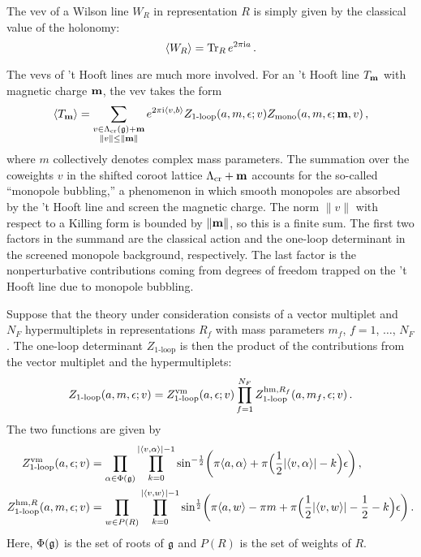 The vev of a Wilson line $W_R$ in representation $R$ is simply given
by the classical value of the holonomy:
\begin{equation}
  \label{eq:vev-W}
    \langle W_R \rangle = \mathop{\mathrm{Tr}}\nolimits_R e^{2\pi \mathrm{i} a} \,.
\end{equation}

The vevs of 't Hooft lines are much more involved.  For an 't Hooft
line $T_{\mathbf{m}}$ with magnetic charge $\mathbf{m}$, the vev takes the form
\begin{equation}
  \label{eq:vev-T}
  \langle T_{\mathbf{m}} \rangle
  =
  \sum_{\substack{v \in \Lambda_{\mathrm{cr}}(\mathfrak{g}) + \mathbf{m} \\ \|v\| \leq \|\mathbf{m}\|}}
  e^{2\pi \mathrm{i} \langle v, b\rangle}
  Z_{\text{1-loop}}(a,m,\epsilon; v) Z_{\text{mono}}(a,m,\epsilon; \mathbf{m},v) \,,
\end{equation}
where $m$ collectively denotes complex mass parameters.  The summation
over the coweights $v$ in the shifted coroot lattice
$\Lambda_{\mathrm{cr}} + \mathbf{m}$ accounts for the so-called ``monopole
bubbling,'' a phenomenon in which smooth monopoles are absorbed by the
't Hooft line and screen the magnetic charge.  The norm $\|v\|$ with
respect to a Killing form is bounded by $\|\mathbf{m}\|$, so this is a
finite sum.  The first two factors in the summand are the classical
action and the one-loop determinant in the screened monopole
background, respectively.  The last factor is the nonperturbative
contributions coming from degrees of freedom trapped on the 't Hooft
line due to monopole bubbling.

Suppose that the theory under consideration consists of a vector
multiplet and $N_F$ hypermultiplets in representations $R_f$ with mass
parameters $m_f$, $f = 1$, $\dotsc$, $N_F$.  The one-loop determinant
$Z_{\text{1-loop}}$ is then the product of the contributions from the
vector multiplet and the hypermultiplets:
\begin{equation}
  Z_{\text{1-loop}}(a,m,\epsilon; v)
  =
  Z_{\text{1-loop}}^{\mathrm{vm}}(a,\epsilon; v)
  \prod_{f=1}^{N_F} Z_{\text{1-loop}}^{\mathrm{hm}, R_f}(a,m_f,\epsilon; v) \,.
\end{equation}
The two functions are given by
\begin{align}
  Z_{\text{1-loop}}^{\mathrm{vm}}(a,\epsilon; v)
  &=\prod_{\alpha \in \Phi(\mathfrak{g})} \prod_{k=0}^{|\langle v, \alpha\rangle| - 1}
    \sin^{-\frac12}
    \biggl(\pi\langle a, \alpha\rangle + \pi\Big(\frac12 |\langle v, \alpha\rangle| - k\Bigr)\epsilon\biggr) \,,
  \\
  Z_{\text{1-loop}}^{\mathrm{hm}, R}(a,m,\epsilon; v)
  &=\prod_{w \in P(R)}\prod_{k=0}^{|\langle v, w\rangle| - 1}
    \sin^{\frac12}\biggl(\pi \langle a, w\rangle - \pi m
    + \pi\Bigl(\frac12|\langle v, w\rangle| - \frac12 - k\Bigr)\epsilon\biggr) \,.
\end{align}
Here, $\Phi(\mathfrak{g})$ is the set of roots of $\mathfrak{g}$ and $P(R)$ is the set
of weights of $R$.

